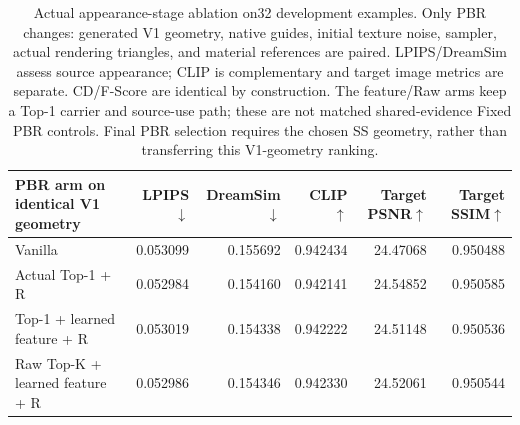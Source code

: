 \begin{table}[t]
\centering\small
\setlength{\tabcolsep}{4pt}
\begin{tabular}{lrrrrr}
\toprule
PBR arm on identical V1 geometry&LPIPS$\downarrow$&DreamSim$\downarrow$&CLIP$\uparrow$&Target PSNR$\uparrow$&Target SSIM$\uparrow$\\
\midrule
Vanilla&0.053099&0.155692&0.942434&24.47068&0.950488\\
Actual Top-1 + R&0.052984&0.154160&0.942141&24.54852&0.950585\\
Top-1 + learned feature + R&0.053019&0.154338&0.942222&24.51148&0.950536\\
Raw Top-K + learned feature + R&0.052986&0.154346&0.942330&24.52061&0.950544\\
\bottomrule
\end{tabular}
\caption{Actual appearance-stage ablation on32 development examples.
Only PBR changes: generated V1 geometry, native guides, initial texture
noise, sampler, actual rendering triangles, and material references are paired.
LPIPS/DreamSim assess source appearance; CLIP is complementary and target
image metrics are separate. CD/F-Score are identical by construction.
The feature/Raw arms keep a Top-1 carrier and source-use path; these are not
matched shared-evidence Fixed PBR controls. Final PBR selection requires
the chosen SS geometry, rather than transferring this V1-geometry ranking.}
\label{tab:pbr-appearance32}
\end{table}
